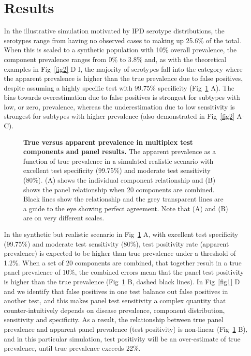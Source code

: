 \documentclass[10pt,letterpaper]{article}
\begin{document}
\section*{Results}

In the illustrative simulation motivated by IPD serotype distributions, the serotypes range from having no observed cases to making up 25.6\% of the total\cite{hyams2023}. When this is scaled to a synthetic population with 10\% overall prevalence, the component prevalence ranges from 0\% to 3.8\% and, as with the theoretical examples in Fig~\ref{fig2} D-I, the majority of serotypes fall into the category where the apparent prevalence is higher than the true prevalence due to false positives, despite assuming a highly specific test with 99.75\% specificity (Fig~\ref{fig3} A). The bias towards overestimation due to false positives is strongest for subtypes with low, or zero, prevalence, whereas the underestimation due to low sensitivity is strongest for subtypes with higher prevalence (also demonstrated in Fig~\ref{fig2} A-C).

\begin{figure}[ht!]
\caption{{\bf True versus apparent prevalence in multiplex test components and panel results.}
The apparent prevalence as a function of true prevalence in a simulated realistic scenario with excellent test specificity (99.75\%) and moderate test sensitivity (80\%). (A) shows the individual component relationship and (B) shows the panel relationship when 20 components are combined. Black lines show the relationship and the grey transparent lines are a guide to the eye showing perfect agreement. Note that (A) and (B) are on very different scales.
}
\label{fig3}
\end{figure}

In the synthetic but realistic scenario in Fig~\ref{fig3} A, with excellent test specificity (99.75\%) and moderate test sensitivity (80\%), test positivity rate (apparent prevalence) is expected to be higher than true prevalence under a threshold of 1.2\%. When a set of 20 components are combined, that together result in a true panel prevalence of 10\%, the combined errors mean that the panel test positivity is higher than the true prevalence (Fig~\ref{fig3} B, dashed black lines). In Fig~\ref{fig1} D and  we identify that false positives in one test balance out false positives in another test, and this makes panel test sensitivity a complex quantity that counter-intuitively depends on disease prevalence, component distribution, sensitivity and specificity. As a result, the relationship between true panel prevalence and apparent panel prevalence (test positivity) is non-linear (Fig~\ref{fig3} B), and in this particular simulation, test positivity will be an over-estimate of true prevalence, until true prevalence exceeds 22\%.
\end{document}
